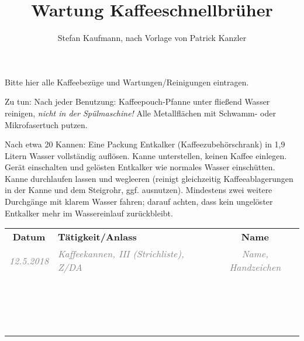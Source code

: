 \documentclass{\basedir/vsh-document}
\title{Wartung Kaffeeschnellbrüher}
\author{Stefan Kaufmann, nach Vorlage von Patrick Kanzler}
\newcommand{\thickhline}{\noalign{\hrule height 2pt}}
\begin{document}
Bitte hier alle Kaffeebezüge und Wartungen/Reinigungen eintragen.

Zu tun: Nach jeder Benutzung: Kaffeepouch-Pfanne unter fließend Wasser reinigen, \emph{nicht in der Spülmaschine!} Alle Metallflächen mit Schwamm- oder Mikrofasertuch putzen.

Nach etwa 20 Kannen: Eine Packung Entkalker (Kaffeezubehörschrank) in 1,9 Litern Wasser vollständig auflösen. Kanne unterstellen, keinen Kaffee einlegen. Gerät einschalten und gelösten Entkalker wie normales Wasser einschütten. Kanne durchlaufen lassen und wegleeren (reinigt gleichzeitig Kaffeeablagerungen in der Kanne und dem Steigrohr, ggf. ausnutzen). Mindestens zwei weitere Durchgänge mit klarem Wasser fahren; darauf achten, dass kein ungelöster Entkalker mehr im Wassereinlauf zurückbleibt.

\newcommand{\bsp}[1]{\textcolor{gray}{\itshape #1}}
\newcommand{\beispielzeile}[5]{\bsp{#2} & \bsp{#3} & \bsp{#4} \\ \hline}
\newcommand{\leerzeile}{\vbox{\vspace{2.4em}} & & \\ \hline}
\vspace{-.4em}
\begin{tabularx}{\textwidth}{|c|X|c|} \hline
\bfseries Datum      &  \bfseries Tätigkeit/Anlass  & \bfseries Name \\\thickhline
\beispielzeile{BSP}{12.5.2018}{ Kaffeekannen, III (Strichliste), Z/DA }{Name, Handzeichen}
\leerzeile
\leerzeile
\leerzeile
\leerzeile
\leerzeile
\leerzeile
\leerzeile
\leerzeile
\leerzeile
\leerzeile
\leerzeile
\leerzeile
\leerzeile
\leerzeile
\leerzeile
\leerzeile
\leerzeile
\leerzeile
\end{tabularx}
\end{document}
